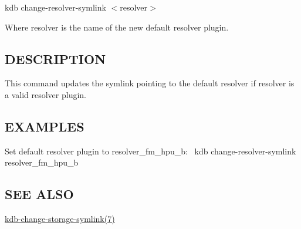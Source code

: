 {\ttfamily kdb change-\/resolver-\/symlink $<$resolver$>$}

Where {\ttfamily resolver} is the name of the new default resolver plugin.

\subsection*{D\+E\+S\+C\+R\+I\+P\+T\+I\+ON}

This command updates the symlink pointing to the default resolver if {\ttfamily resolver} is a valid resolver plugin.

\subsection*{E\+X\+A\+M\+P\+L\+ES}

Set default resolver plugin to resolver\+\_\+fm\+\_\+hpu\+\_\+b\+:~\newline
 {\ttfamily kdb change-\/resolver-\/symlink resolver\+\_\+fm\+\_\+hpu\+\_\+b}

\subsection*{S\+EE A\+L\+SO}


\begin{DoxyItemize}
\item \hyperlink{md_doc_help_kdb-change-storage-symlink_doc_help_kdb-change-storage-symlink_md}{kdb-\/change-\/storage-\/symlink(7)} 
\end{DoxyItemize}